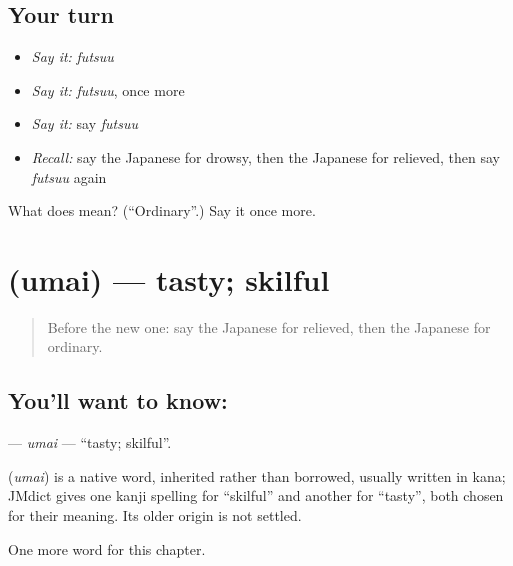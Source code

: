 \subsection*{Your turn}
\begin{itemize}
\raggedright
  \item \emph{Say it:} \emph{futsuu}
  \item \emph{Say it:} \emph{futsuu}, once more
  \item \emph{Say it:} say \emph{futsuu}
  \item \emph{Recall:} say the Japanese for drowsy, then the Japanese for relieved, then say \emph{futsuu} again
\end{itemize}

\begin{tcolorbox}[breakable,colback=teal!4,colframe=teal!35!black,title={Before you move on}]
What does  mean? (\textquotedblleft{}Ordinary\textquotedblright{}.) Say it once more.
\end{tcolorbox}
\section[\texorpdfstring{\ja{うまい} (umai)}{うまい (umai)}]{ (umai) — tasty; skilful}

\label{lesson:JA-C126-umai}



\begin{quote}
Before the new one: say the Japanese for relieved, then the Japanese for ordinary.
\end{quote}

\subsection*{You'll want to know: }
\textbf{} — \emph{umai} — \textquotedblleft{}tasty; skilful\textquotedblright{}.

\begin{cousinweb}
\textbf{} (\emph{umai}) is a native word, inherited rather than borrowed, usually written in kana; JMdict gives one kanji spelling for \textquotedblleft{}skilful\textquotedblright{} and another for \textquotedblleft{}tasty\textquotedblright{}, both chosen for their meaning. Its older origin is not settled.
\end{cousinweb}

\begin{grammarlens}[title={What you've built}]
One more word for this chapter.
\end{grammarlens}

